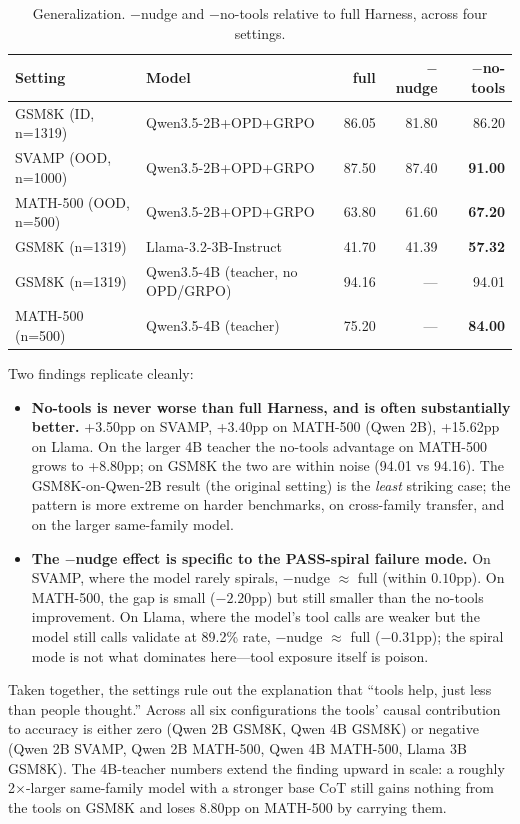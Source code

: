 \documentclass[10pt]{article}
\begin{document}
\begin{table}[h]
\centering
\caption{Generalization. $-$nudge and $-$no-tools relative to full Harness, across four settings.}
\label{tab:cross}
\begin{tabular}{llrrr}
\toprule
Setting & Model & full & $-$nudge & $-$no-tools \\
\midrule
GSM8K (ID, n=1319) & Qwen3.5-2B+OPD+GRPO & 86.05 & 81.80 & 86.20 \\
SVAMP (OOD, n=1000) & Qwen3.5-2B+OPD+GRPO & 87.50 & 87.40 & \textbf{91.00} \\
MATH-500 (OOD, n=500) & Qwen3.5-2B+OPD+GRPO & 63.80 & 61.60 & \textbf{67.20} \\
GSM8K (n=1319) & Llama-3.2-3B-Instruct & 41.70 & 41.39 & \textbf{57.32} \\
\midrule
GSM8K (n=1319) & Qwen3.5-4B (teacher, no OPD/GRPO) & 94.16 & --- & 94.01 \\
MATH-500 (n=500) & Qwen3.5-4B (teacher) & 75.20 & --- & \textbf{84.00} \\
\bottomrule
\end{tabular}
\end{table}

Two findings replicate cleanly:
\begin{itemize}
  \item \textbf{No-tools is never worse than full Harness, and is often substantially better.} +3.50pp on SVAMP, +3.40pp on MATH-500 (Qwen 2B), +15.62pp on Llama. On the larger 4B teacher the no-tools advantage on MATH-500 grows to +8.80pp; on GSM8K the two are within noise (94.01 vs 94.16). The GSM8K-on-Qwen-2B result (the original setting) is the \emph{least} striking case; the pattern is more extreme on harder benchmarks, on cross-family transfer, and on the larger same-family model.
  \item \textbf{The $-$nudge effect is specific to the PASS-spiral failure mode.} On SVAMP, where the model rarely spirals, $-$nudge $\approx$ full (within $0.10$pp). On MATH-500, the gap is small ($-2.20$pp) but still smaller than the no-tools improvement. On Llama, where the model's tool calls are weaker but the model still calls validate at 89.2\% rate, $-$nudge $\approx$ full ($-$0.31pp); the spiral mode is not what dominates here---tool exposure itself is poison.
\end{itemize}

Taken together, the settings rule out the explanation that ``tools help, just less than people thought.'' Across all six configurations the tools' causal contribution to accuracy is either zero (Qwen 2B GSM8K, Qwen 4B GSM8K) or negative (Qwen 2B SVAMP, Qwen 2B MATH-500, Qwen 4B MATH-500, Llama 3B GSM8K). The 4B-teacher numbers extend the finding upward in scale: a roughly 2$\times$-larger same-family model with a stronger base CoT still gains nothing from the tools on GSM8K and loses 8.80pp on MATH-500 by carrying them.
\end{document}
